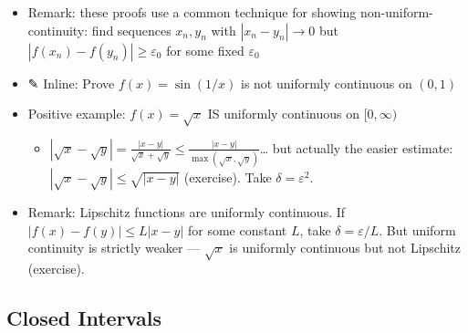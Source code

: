 \documentclass[
  10pt,
  letterpaper,
]{scrbook}
\providecommand{\tightlist}{%
  \setlength{\itemsep}{0pt}\setlength{\parskip}{0pt}}
\begin{document}
\begin{itemize}
  \begin{itemize}
  \tightlist
  \item
    Take \(x_n = n\), \(y_n = n + 1/n\). Then
    \(|x_n - y_n| = 1/n \to 0\), but
    \(|f(x_n) - f(y_n)| = |2 + 1/n^2| \to 2\)
  \item
    The function grows too fast --- far from the origin, small changes
    in \(x\) produce large changes in \(x^2\)
  \end{itemize}
\item
  Remark: these proofs use a common technique for showing
  non-uniform-continuity: find sequences \(x_n, y_n\) with
  \(|x_n - y_n| \to 0\) but \(|f(x_n) - f(y_n)| \geq \varepsilon_0\) for
  some fixed \(\varepsilon_0\)
\item
  ✎ Inline: Prove \(f(x) = \sin(1/x)\) is not uniformly continuous on
  \((0, 1)\)
\item
  Positive example: \(f(x) = \sqrt{x}\) IS uniformly continuous on
  \([0, \infty)\)

  \begin{itemize}
  \tightlist
  \item
    \(|\sqrt{x} - \sqrt{y}| = \frac{|x - y|}{\sqrt{x} + \sqrt{y}} \leq \frac{|x - y|}{\max(\sqrt{x}, \sqrt{y})}\)\ldots{}
    but actually the easier estimate:
    \(|\sqrt{x} - \sqrt{y}| \leq \sqrt{|x - y|}\) (exercise). Take
    \(\delta = \varepsilon^2\).
  \end{itemize}
\item
  Remark: Lipschitz functions are uniformly continuous. If
  \(|f(x) - f(y)| \leq L|x - y|\) for some constant \(L\), take
  \(\delta = \varepsilon / L\). But uniform continuity is strictly
  weaker --- \(\sqrt{x}\) is uniformly continuous but not Lipschitz
  (exercise).
\end{itemize}

\subsection{Closed Intervals}\label{closed-intervals}
\end{document}
